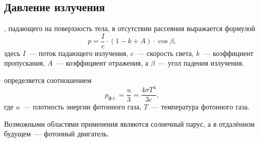 \subsection{Давление излучения}
, падающего на поверхность тела, в отсутствии рассеяния выражается формулой
\begin{equation}
p = \frac{I}{c} \cdot (1 - k + A) \cdot \cos \beta,
\end{equation}
здесь $I$~--- поток падающего излучения, $c$~--- скорость света, $k$~--- коэффициент пропускания, $A$~--- коэффициент отражения, а $\beta$~--- угол падения излучения.

 определяется соотношением
\begin{equation}
p_\text{ф.г.} = \frac{u}{3} = \frac{4 \sigma T^4}{3c},
\end{equation}
где $u$~--- плотность энергии фотонного газа, $T$~--- температура фотонного газа.

Возможными областями применения являются солнечный парус, а в отдалённом будущем~--- фотонный двигатель.